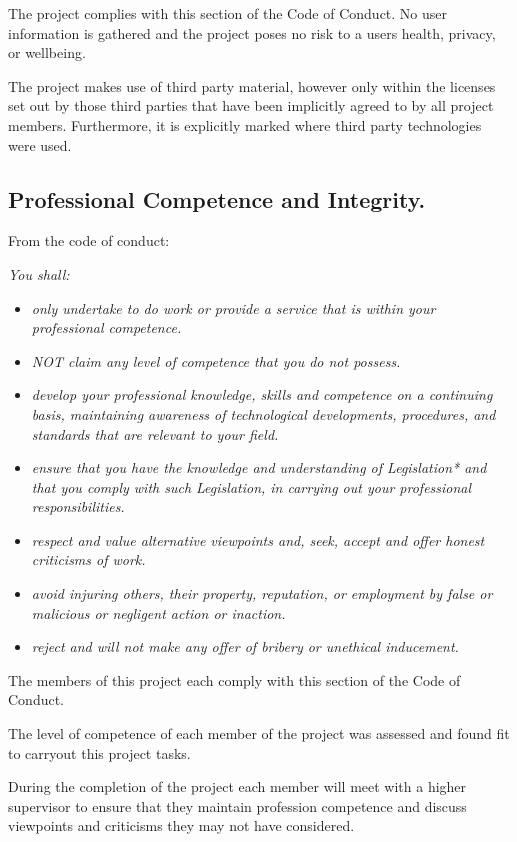 \documentclass[a4paper]{report}
\begin{document}
The project complies with this section of the Code of Conduct. No user information is gathered and the project poses no risk to a users health, privacy, or wellbeing.

The project makes use of third party material, however only within the licenses set out by those third parties that have been implicitly agreed to by all project members. Furthermore, it is explicitly marked where third party technologies were used.


\subsection*{Professional Competence and Integrity.}

From the code of conduct: \cite{CoC}

\textit{You shall:}
\begin{itemize}
\item \textit{only undertake to do work or provide a service that is within your professional competence.}
\item \textit{NOT claim any level of competence that you do not possess.}
\item \textit{develop your professional knowledge, skills and competence on a continuing basis, maintaining awareness of technological developments, procedures, and standards that are relevant to your field.}
\item \textit{ensure that you have the knowledge and understanding of Legislation* and that you comply with such Legislation, in carrying out your professional responsibilities. }
\item \textit{respect and value alternative viewpoints and, seek, accept and offer honest criticisms of work.}
\item \textit{avoid injuring others, their property, reputation, or employment by false or malicious or negligent action or inaction.}
\item \textit{reject and will not make any offer of bribery or unethical inducement.}
\end{itemize}

The members of this project each comply with this section of the Code of Conduct.

The level of competence of each member of the project was assessed and found fit to carryout this project tasks.

During the completion of the project each member will meet with a higher supervisor to ensure that they maintain profession competence and discuss viewpoints and criticisms they may not have considered.
\end{document}
